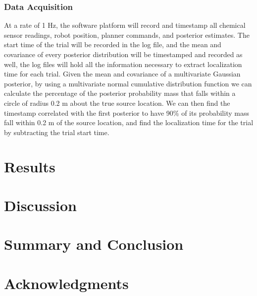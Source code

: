\documentclass[submit]{aiaa-pretty-modified}
\begin{document}
\subsubsection{Data Acquisition}
At a rate of 1 Hz, the software platform will record and
timestamp all chemical sensor readings, robot position, planner commands, and
posterior estimates. The start time of the trial will be recorded
in the log file, and the mean and covariance of every posterior
distribution will be timestamped and recorded as well, the log files will hold all the
information necessary to extract localization time for each trial.
Given the mean and covariance of a multivariate Gaussian
posterior, by using a multivariate normal cumulative distribution
function we can calculate the percentage of the posterior probability
mass that falls within a circle of radius 0.2 m about the true source
location. We can then find the timestamp correlated with the first
posterior to have 90\% of its probability mass fall within 0.2 m of
the source location, and find the localization time for the trial by
subtracting the trial start time.

\section{Results}

\section{Discussion}

\section{Summary and Conclusion}

\section{Acknowledgments}

\newpage


\nocite{*}
\end{document}
